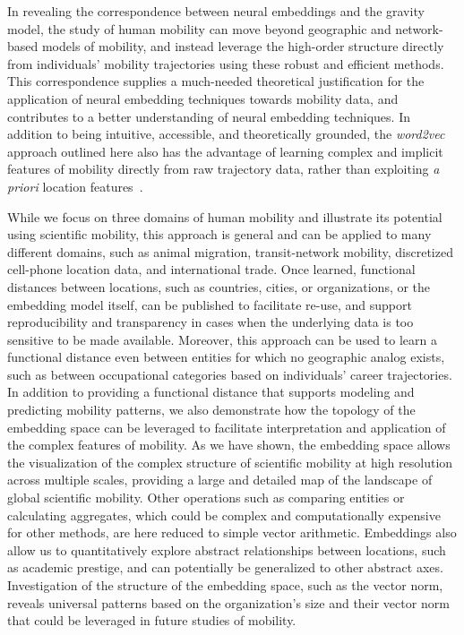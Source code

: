 \documentclass[12pt]{article} %
\begin{document}
In revealing the correspondence between neural embeddings and the gravity model, the study of human mobility can move beyond geographic and network-based models of mobility, and instead leverage the high-order structure directly from individuals' mobility trajectories using these robust and efficient methods.
This correspondence supplies a much-needed theoretical justification for the application of neural embedding techniques towards mobility data, and contributes to a better understanding of neural embedding techniques. 
In addition to being intuitive, accessible, and theoretically grounded, the \textit{word2vec} approach outlined here also has the advantage of learning complex and implicit features of mobility directly from raw trajectory data, rather than exploiting \textit{a priori} location features~\cite{simini2021deep}.


While we focus on three domains of human mobility and illustrate its potential using scientific mobility, this approach is general and can be applied to many different domains, such as animal migration, transit-network mobility,  discretized cell-phone location data,  and international trade.
Once learned, functional distances between locations, such as countries, cities, or organizations, or the embedding model itself, can be published to facilitate re-use, and support reproducibility and transparency in cases when the underlying data is too sensitive to be made available.
Moreover, this approach can be used to learn a functional distance even between entities for which no geographic analog exists, such as between occupational categories based on individuals' career trajectories.
In addition to providing a functional distance that supports modeling and predicting mobility patterns, we also demonstrate how the topology of the embedding space can be leveraged to facilitate interpretation and application of the complex features of mobility.
As we have shown, the embedding space allows the visualization of the complex structure of scientific mobility at high resolution across multiple scales, providing a large and detailed map of the landscape of global scientific mobility.
Other operations such as comparing entities or calculating aggregates, which could be complex and computationally expensive for other methods, are here reduced to simple vector arithmetic.
Embeddings also allow us to quantitatively explore abstract relationships between locations, such as academic prestige, and can potentially be generalized to other abstract axes.
Investigation of the structure of the embedding space, such as the vector norm, reveals universal patterns based on the organization's size and their vector norm that could be leveraged in future studies of mobility.
\end{document}
